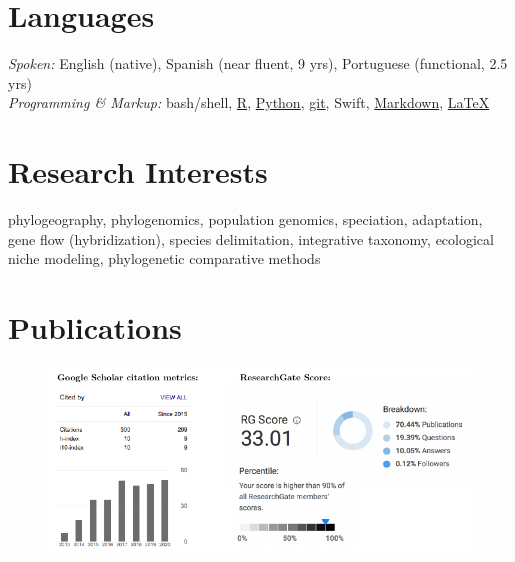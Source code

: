 \documentclass[margin,line]{res}
\begin{document}
\begin{resume}

\section{\sc Languages}
\emph{Spoken:} English (native), Spanish (near fluent, 9 yrs), Portuguese (functional, 2.5 yrs) \\
\emph{Programming \& Markup:} \textsf{bash}/shell, \href{https://cran.r-project.org}{\textsf{R}}, \href{https://www.python.org}{Python}, \href{https://git-scm.com}{\textsf{git}}, Swift, \href{https://www.markdownguide.org}{Markdown}, \href{https://www.latex-project.org}{\LaTeX}



\section{\sc Research Interests}
phylogeography, phylogenomics, population genomics, speciation, adaptation, \\
gene flow (hybridization), species delimitation, integrative taxonomy, ecological \\
niche modeling, phylogenetic comparative methods



\section{\sc Publications}


\begin{figure}[h]
	\includegraphics[scale=1.1]{./metrics_Oct152020.pdf}
\end{figure}


\end{resume}
\end{document}
